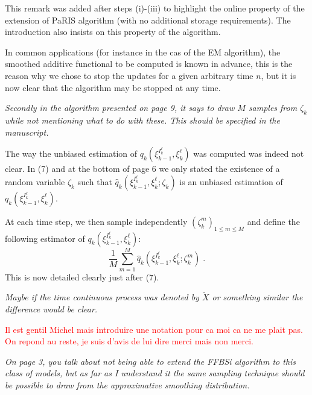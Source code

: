 \documentclass[12pt]{article}
\newcommand{\eqsp}{\;}
\newcommand{\1}{\mathrm{1}}
\begin{document}
This remark was added after steps (i)-(iii) to highlight the online property of the extension of PaRIS algorithm (with no additional storage requirements). The introduction also insists on this property of the algorithm.

In common applications (for instance in the cas of the EM algorithm),  the smoothed additive functional to be computed is known in advance, this is the reason why we chose to stop the updates for a given arbitrary time $n$, but it is now clear that the algorithm may be stopped at any time.

\vspace{1cm}

{\em Secondly in the algorithm presented on page 9, it says to draw $M$ samples from $\zeta_k$ while not mentioning
what to do with these. This should be specified in the manuscript.}

\vspace{.3cm}

The way the unbiased estimation of $q_k(\xi^{I_k^\ell}_{k-1},\xi^\ell_k)$ was computed was indeed not clear. In (7) and at the bottom of page 6 we only stated the existence of a random variable $\zeta_k$ such that $\widehat{q}_k(\xi^{I_k^\ell}_{k-1},\xi^\ell_k;\zeta_k)$ is an unbiased estimation of $q_k(\xi^{I_k^\ell}_{k-1},\xi^\ell_k)$. 

At each time step, we then sample independently $(\zeta^m_k)_{1\le m \le M}$ and define the following estimator of $q_k(\xi^{I_k^\ell}_{k-1},\xi^\ell_k)$:
\[
\frac{1}{M}\sum_{m=1}^M \widehat{q}_k(\xi^{I_k^\ell}_{k-1},\xi^\ell_k;\zeta^m_k)\eqsp.
\]
This is now detailed clearly just after (7).

\vspace{1cm}


{\em Maybe if the time continuous process was denoted by $\widetilde{X}$ or something similar the difference would be clear.}

\vspace{.3cm}

\textcolor{red}{Il est gentil Michel mais introduire une notation pour ca moi ca ne me plait pas. On repond au reste, je suis d'avis de lui dire merci mais non merci.}

\vspace{1cm}

{\em
On page 3, you talk about not being able to extend the FFBSi algorithm to this class of models, but
as far as I understand it the same sampling technique should be possible to draw from the approximative
smoothing distribution.
}
\end{document}

